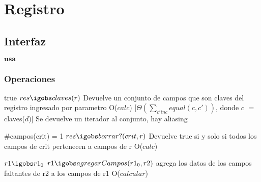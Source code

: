 



\section{Registro}

\subsection{Interfaz}

$\textbf{usa}$  




\subsubsection*{Operaciones}





 {true}
 {$res \igobs claves(r)$}
 {Devuelve un conjunto de campos que son claves del registro ingresado por parametro}
 {O($calc$) [$\Theta(\sum_{c' in  c}equal(c,c'))$, donde $c$ $=$ claves($d$)]}
 {Se devuelve un iterador al conjunto, hay aliasing}

 {#campos(crit) = 1}
 {$res \igobs borrar?(crit, r)$}
 {Devuelve true si y solo si todos los campos de crit pertenecen a campos de r}
 {O($calc$)} %
 {}

 {$ r1 \igobs r1_0 $}
 {$r1 \igobs agregarCampos(r1_0, r2) $}
 {agrega los datos de los campos faltantes de r2 a los campos de r1}
 {O($calcular$)  }
 {}
 
